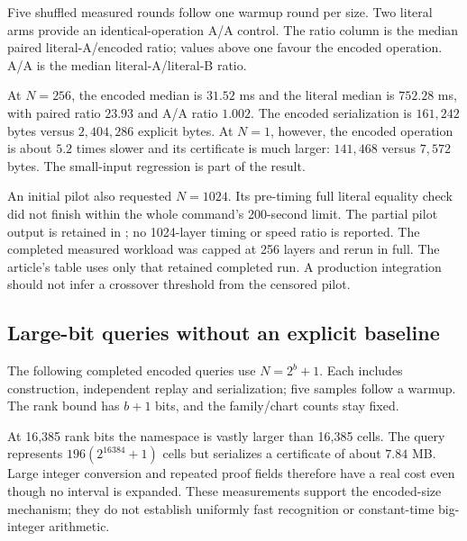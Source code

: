 \documentclass[11pt]{article}
\theoremstyle{definition}\newtheorem{definition}[theorem]{Definition}
\theoremstyle{remark}\newtheorem{remark}[theorem]{Remark}
\newcommand{\code}[1]{\texttt{\detokenize{#1}}}
\begin{document}
Five shuffled measured rounds follow one warmup round per size. Two literal arms provide an identical-operation A/A control. The ratio column is the median paired literal-A/encoded ratio; values above one favour the encoded operation. A/A is the median literal-A/literal-B ratio.

\begin{center}\small

\end{center}

At \(N=256\), the encoded median is \(31.52\) ms and the literal median is \(752.28\) ms, with paired ratio \(23.93\) and A/A ratio \(1.002\). The encoded serialization is \(161{,}242\) bytes versus \(2{,}404{,}286\) explicit bytes. At \(N=1\), however, the encoded operation is about \(5.2\) times slower and its certificate is much larger: \(141{,}468\) versus \(7{,}572\) bytes. The small-input regression is part of the result.

An initial pilot also requested \(N=1024\). Its pre-timing full literal equality check did not finish within the whole command's 200-second limit. The partial pilot output is retained in \code{results/benchmark_pilot_partial.txt}; no 1024-layer timing or speed ratio is reported. The completed measured workload was capped at 256 layers and rerun in full. The article's table uses only that retained completed run. A production integration should not infer a crossover threshold from the censored pilot.

\subsection{Large-bit queries without an explicit baseline}
The following completed encoded queries use \(N=2^b+1\). Each includes construction, independent replay and serialization; five samples follow a warmup. The rank bound has \(b+1\) bits, and the family/chart counts stay fixed.
\begin{center}\small

\end{center}

At 16,385 rank bits the namespace is vastly larger than 16,385 cells. The query represents \(196(2^{16384}+1)\) cells but serializes a certificate of about \(7.84\) MB. Large integer conversion and repeated proof fields therefore have a real cost even though no interval is expanded. These measurements support the encoded-size mechanism; they do not establish uniformly fast recognition or constant-time big-integer arithmetic.
\end{document}
